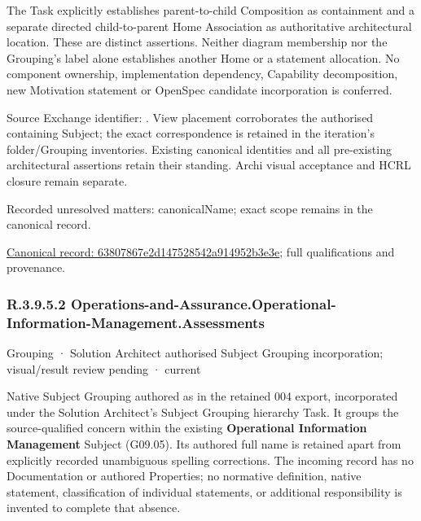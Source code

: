 The Task explicitly establishes parent-to-child Composition as containment and
a separate directed child-to-parent Home Association as authoritative architectural
location. These are distinct assertions. Neither diagram membership nor the
Grouping's label alone establishes another Home or a statement allocation.
No component ownership, implementation dependency, Capability decomposition,
new Motivation statement or OpenSpec candidate incorporation is conferred.



Source Exchange identifier: \texttt{}. View placement corroborates
the authorised containing Subject; the exact correspondence is retained in the
iteration's folder/Grouping inventories. Existing canonical identities and all
pre-existing architectural assertions retain their standing. Archi visual
acceptance and HCRL closure remain separate.


{\small Recorded unresolved matters: canonicalName; exact scope remains in the canonical record.}\par
{\footnotesize \href{../../../../continuum/grouping/63807867e2d147528542a914952b3e3e.md}{Canonical record: 63807867e2d147528542a914952b3e3e}; full qualifications and provenance.}\par
\subsubsection*{R.3.9.5.2 Operations-and-Assurance.Operational-Information-Management.Assessments}
\label{navigation:R.3.9.5.2}

\label{element:f147597cd5e04696887257c6316eedf7}
{\small Grouping · Solution Architect authorised Subject Grouping incorporation; visual/result review pending · current}\par

Native Subject Grouping authored as \texttt{} in the retained 004 export,
incorporated under the Solution Architect's Subject Grouping hierarchy Task.
It groups the source-qualified \texttt{} concern within
the existing \textbf{Operational Information Management} Subject (G09.05). Its authored full name
is retained apart from explicitly recorded unambiguous spelling corrections.
The incoming record has no Documentation or authored Properties; no normative
definition, native statement, classification of individual statements, or
additional responsibility is invented to complete that absence.



